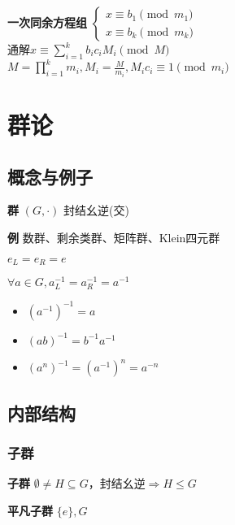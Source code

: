 \documentclass[a4paper,10pt]{ctexart}
\newcommand*{\impl}{\Rightarrow}
\renewcommand*{\leq}{\leqslant}
\begin{document}
\begin{multicols}{3}
    \textbf{一次同余方程组} $\begin{cases}
            x \equiv b_1 \pmod{m_1} \\
            x \equiv b_k \pmod{m_k}
        \end{cases}$\\
    通解$x \equiv \sum_{i=1}^k b_i c_i M_i \pmod{M}$\\
    $M \! = \! \prod\limits_{i=1}^k m_i, M_i \! = \! \frac{M}{m_i}, M_i c_i \equiv 1 \pmod{m_i}$

    \section{群论}

    \subsection{概念与例子}

    \textbf{群} $(G, \cdot)$ 封结幺逆(交)

    \textbf{例} 数群、剩余类群、矩阵群、Klein四元群

    \begin{theorem}[幺元性质]
        $e_L = e_R = e$
    \end{theorem}

    \begin{theorem}[逆元性质]
        $\forall a \in G, a_L^{-1} = a_R^{-1} = a^{-1}$

        \begin{itemize}
            \item $(a^{-1})^{-1} = a$
            \item $(ab)^{-1}=b^{-1}a^{-1}$
            \item $(a^n)^{-1}=(a^{-1})^n=a^{-n}$
        \end{itemize}
    \end{theorem}

    \subsection{内部结构}

    \subsubsection{子群}

    \textbf{子群} $\emptyset \!\neq\! H \!\subseteq\! G$，封结幺逆$\impl H \!\leq\! G$

    \textbf{平凡子群} $\{e\}, G$


\end{multicols}
\end{document}
